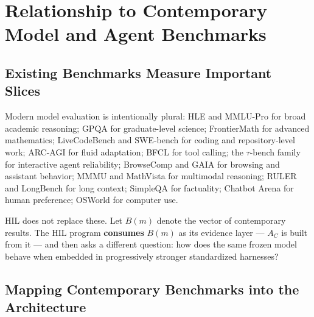 \documentclass[11pt]{article}
\theoremstyle{definition}
\begin{document}
\section{Relationship to Contemporary Model and Agent Benchmarks}

\subsection{Existing Benchmarks Measure Important Slices}

Modern model evaluation is intentionally plural: HLE \citep{phan2025hle} and MMLU-Pro \citep{wang2024mmlupro} for broad academic reasoning; GPQA \citep{rein2023gpqa} for graduate-level science; FrontierMath \citep{glazer2024frontiermath} for advanced mathematics; LiveCodeBench \citep{jain2024livecodebench} and SWE-bench \citep{jimenez2023swebench} for coding and repository-level work; ARC-AGI \citep{arc2026} for fluid adaptation; BFCL \citep{patil2025bfcl} for tool calling; the $\tau$-bench family \citep{yao2024taubench} for interactive agent reliability; BrowseComp \citep{wei2025browsecomp} and GAIA \citep{mialon2023gaia} for browsing and assistant behavior; MMMU \citep{yue2023mmmu} and MathVista \citep{lu2023mathvista} for multimodal reasoning; RULER \citep{hsieh2024ruler} and LongBench \citep{bai2024longbench} for long context; SimpleQA \citep{openai2024simpleqa} for factuality; Chatbot Arena \citep{chiang2024arena} for human preference; OSWorld \citep{xie2024osworld} for computer use.

HIL does not replace these. Let $B(m)$ denote the vector of contemporary results. The HIL program \textbf{consumes} $B(m)$ as its evidence layer --- $A_C$ is built from it --- and then asks a different question: how does the same frozen model behave when embedded in progressively stronger standardized harnesses?

\subsection{Mapping Contemporary Benchmarks into the Architecture}
\end{document}
